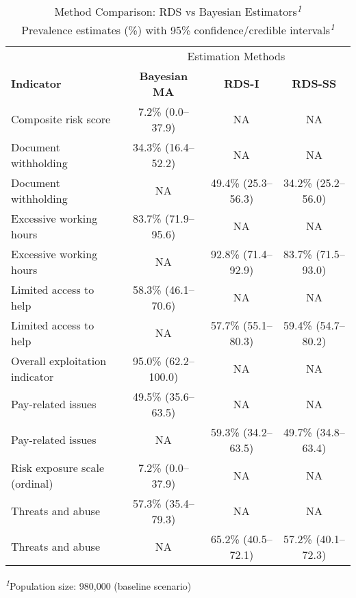 \begin{table}[t]
\caption*{
{\large Method Comparison: RDS vs Bayesian Estimators\textsuperscript{\textit{1}}} \\ 
{\small Prevalence estimates (\%) with 95\% confidence/credible intervals\textsuperscript{\textit{1}}}
} 
\fontsize{9.0pt}{10.8pt}\selectfont
\begin{tabular*}{\linewidth}{@{\extracolsep{\fill}}lccc}
\toprule
 & \multicolumn{3}{c}{Estimation Methods} \\ 
\cmidrule(lr){2-4}
{\bfseries Indicator} & {\bfseries Bayesian MA} & {\bfseries RDS-I} & {\bfseries RDS-SS} \\ 
\midrule\addlinespace[2.5pt]
Composite risk score & 7.2\% (0.0–37.9) & NA & NA \\ 
Document withholding & 34.3\% (16.4–52.2) & NA & NA \\ 
Document withholding & NA & 49.4\% (25.3–56.3) & 34.2\% (25.2–56.0) \\ 
Excessive working hours & 83.7\% (71.9–95.6) & NA & NA \\ 
Excessive working hours & NA & 92.8\% (71.4–92.9) & 83.7\% (71.5–93.0) \\ 
Limited access to help & 58.3\% (46.1–70.6) & NA & NA \\ 
Limited access to help & NA & 57.7\% (55.1–80.3) & 59.4\% (54.7–80.2) \\ 
Overall exploitation indicator & 95.0\% (62.2–100.0) & NA & NA \\ 
Pay-related issues & 49.5\% (35.6–63.5) & NA & NA \\ 
Pay-related issues & NA & 59.3\% (34.2–63.5) & 49.7\% (34.8–63.4) \\ 
Risk exposure scale (ordinal) & 7.2\% (0.0–37.9) & NA & NA \\ 
Threats and abuse & 57.3\% (35.4–79.3) & NA & NA \\ 
Threats and abuse & NA & 65.2\% (40.5–72.1) & 57.2\% (40.1–72.3) \\ 
\bottomrule
\end{tabular*}
\begin{minipage}{\linewidth}
\textsuperscript{\textit{1}}Population size: 980,000 (baseline scenario)\\
\end{minipage}
\end{table}

